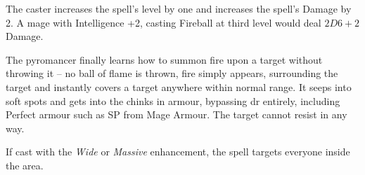 \begin{multicols}{2}
The caster increases the spell's level by one and increases the spell's Damage by 2.  A mage with Intelligence +2, casting Fireball at third level would deal $2D6+2$ Damage.

The pyromancer finally learns how to summon fire upon a target without throwing it -- no ball of flame is thrown, fire simply appears, surrounding the target and instantly covers a target anywhere within normal range. It seeps into soft spots and gets into the chinks in armour, bypassing \gls{dr} entirely, including Perfect armour such as \gls{SP} from Mage Armour. The target cannot resist in any way.

If cast with the \textit{Wide} or \textit{Massive} enhancement, the spell targets everyone inside the area.

\end{multicols}


